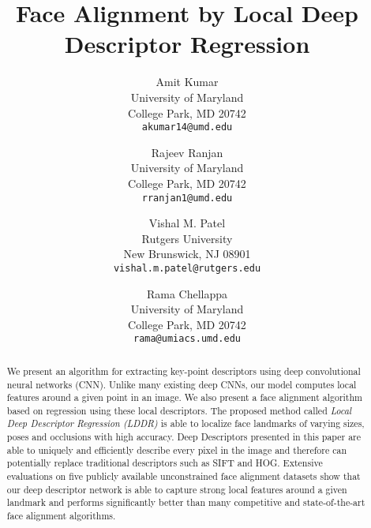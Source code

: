 \documentclass[10pt,twocolumn,letterpaper]{article}
\begin{document}
\title{Face Alignment by Local Deep Descriptor Regression}


\author{Amit Kumar\\
University of Maryland\\
College Park, MD 20742\\
{\tt\small akumar14@umd.edu}
\and
Rajeev Ranjan\\
University of Maryland\\
College Park, MD 20742\\
{\tt\small rranjan1@umd.edu}
\and
Vishal M. Patel\\
Rutgers University\\
New Brunswick, NJ 08901\\
{\tt\small vishal.m.patel@rutgers.edu}
\and
Rama Chellappa\\
University of Maryland\\
College Park, MD 20742\\
{\tt\small rama@umiacs.umd.edu}
}

\maketitle

\begin{abstract}
   We present an algorithm for extracting key-point descriptors using deep convolutional neural networks (CNN). Unlike many existing deep CNNs, our model computes local features around a given point in an image. We also present a face alignment algorithm based on regression using these local descriptors. The proposed method called \textit{Local Deep Descriptor Regression (LDDR)} is able to localize face landmarks of varying sizes, poses and occlusions with high accuracy. Deep Descriptors presented in this paper are able to uniquely and efficiently describe every pixel in the image and therefore can potentially replace traditional descriptors such as SIFT and HOG. Extensive evaluations on five publicly available unconstrained face alignment datasets show that our deep descriptor network is able to capture strong local features around a given landmark and performs significantly better than many competitive and state-of-the-art face alignment algorithms.
\end{abstract}
\end{document}

